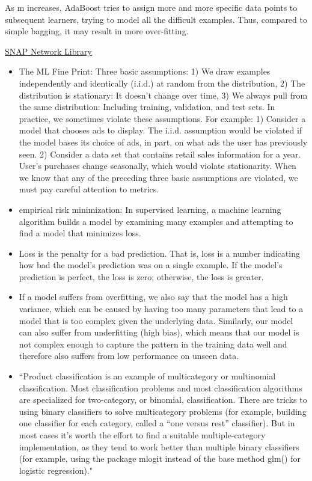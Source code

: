 \documentclass[]{book}
\begin{document}
As m increases, AdaBoost tries to assign more and more specific data points to subsequent learners, trying to model all the difficult examples. Thus, compared to simple bagging, it may result in more over-fitting.

\href{https://snap.stanford.edu/snappy/index.html}{SNAP Network Library}

\begin{itemize}
\item
  The ML Fine Print: Three basic assumptions: 1) We draw examples independently and identically (i.i.d.) at random from the distribution, 2) The distribution is stationary: It doesn't change over time, 3) We always pull from the same distribution: Including training, validation, and test sets. In practice, we sometimes violate these assumptions. For example: 1) Consider a model that chooses ads to display. The i.i.d. assumption would be violated if the model bases its choice of ads, in part, on what ads the user has previously seen. 2) Consider a data set that contains retail sales information for a year. User's purchases change seasonally, which would violate stationarity. When we know that any of the preceding three basic assumptions are violated, we must pay careful attention to metrics.
\item
  empirical risk minimization: In supervised learning, a machine learning algorithm builds a model by examining many examples and attempting to find a model that minimizes loss.
\item
  Loss is the penalty for a bad prediction. That is, loss is a number indicating how bad the model's prediction was on a single example. If the model's prediction is perfect, the loss is zero; otherwise, the loss is greater.
\item
  If a model suffers from overfitting, we also say that the model has a high variance, which can be caused by having too many parameters that lead to a model that is too complex given the underlying data. Similarly, our model can also suffer from underfitting (high bias), which means that our model is not complex enough to capture the pattern in the training data well and therefore also suffers from low performance on unseen data.
\item
  ``Product classification is an example of multicategory or multinomial classification. Most classification problems and most classification algorithms are specialized for two-category, or binomial, classification. There are tricks to using binary classifiers to solve multicategory problems (for example, building one classifier for each category, called a ``one versus rest'' classifier). But in most cases it's worth the effort to find a suitable multiple-category implementation, as they tend to work better than multiple binary classifiers (for example, using the package mlogit instead of the base method glm() for logistic regression)."
\end{itemize}
\end{document}

